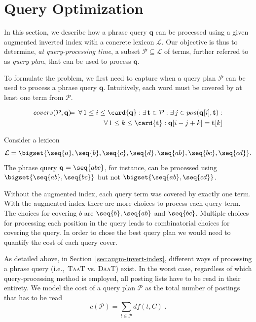 \section{Query Optimization}
\label{sec:query-optimization}

In this section, we describe how a phrase query $\mathbf{q}$ can be
processed using a given augmented inverted index with a concrete
lexicon $\mathcal{L}$. Our objective is thus to determine, \emph{at
query-processing time}, a subset $\mathcal{P} \subseteq \mathcal{L}$ of
terms, further referred to as \emph{query plan}, that can be used to
process $\mathbf{q}$.



To formulate the problem, we first need to capture when a query plan
$\mathcal{P}$ can be used to process a phrase query
$\mathbf{q}$. Intuitively, each word must be covered by at least one
term from $\mathcal{P}$. 

\begin{definition}
\begin{eqnarray*}
covers(\mathcal{P}, \mathbf{q}) & \!\!\!=\!\!\! & \forall{\,1 \le i \le \card{\mathbf{q}}} : \exists{\,\mathbf{t} \in \mathcal{P}} : \exists{\,j \in pos(\mathbf{q}[i], \mathbf{t})} : \\
& & \forall{\,1 \le k \le \card{\mathbf{t}} : \mathbf{q}[i - j + k] = \mathbf{t}[k]}
\end{eqnarray*}
\end{definition}

Consider a lexicon $$\mathcal{L} = \bigset{ \seq{a},\seq{b},\seq{c},\seq{d}, \seq{a b}, \seq{b c}, \seq{c d}}.$$ The phrase query $\mathbf{q} = \seq{a b c}$, for instance, can be
processed using $\bigset{\seq{a b}, \seq{b c}}$ but not
$\bigset{\seq{a b}, \seq{c d}}$. 

Without the augmented index, each query term was covered by exactly one term. With the augmented index there are more choices to process each query term. The choices for covering $b$ are $\seq{b}, \seq{a b}$ and $\seq{b c}$. Multiple choices for processing each position in the query leads to combinatorial choices for covering the query. In order to chose the best query plan we would need to quantify the cost of each query cover.

As detailed above, in Section~\ref{sec:augm-invert-index}, different ways of processing a phrase query (i.e.,~\textsc{TaaT} vs. \textsc{DaaT}) exist. In the worst case, regardless of which query-processing method is employed,
all posting lists have to be read in their entirety. We model the cost
of a query plan $\mathcal{P}$ as the total number of postings that has
to be read
$$
c(\mathcal{P}) = \sum_{t\in\mathcal{P}} df(t, C)\;.
$$

